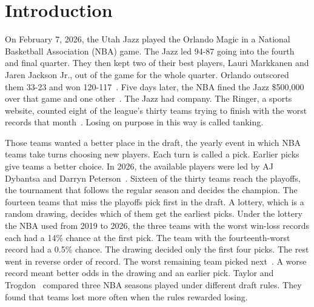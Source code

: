 \documentclass[11pt,letterpaper]{article}
\begin{document}
\section{Introduction}

On February 7, 2026, the Utah Jazz played the Orlando Magic in a National Basketball Association (NBA) game. The Jazz led 94-87 going into the fourth and final quarter. They then kept two of their best players, Lauri Markkanen and Jaren Jackson Jr., out of the game for the whole quarter. Orlando outscored them 33-23 and won 120-117~\cite{espn2026jazzmagic}. Five days later, the NBA fined the Jazz \$500,000 over that game and one other~\cite{nba2026fines}. The Jazz had company. The Ringer, a sports website, counted eight of the league's thirty teams trying to finish with the worst records that month~\cite{ringer2026tanking}. Losing on purpose in this way is called tanking.

Those teams wanted a better place in the draft, the yearly event in which NBA teams take turns choosing new players. Each turn is called a pick. Earlier picks give teams a better choice. In 2026, the available players were led by AJ Dybantsa and Darryn Peterson~\cite{ringer2026tanking}. Sixteen of the thirty teams reach the playoffs, the tournament that follows the regular season and decides the champion. The fourteen teams that miss the playoffs pick first in the draft. A lottery, which is a random drawing, decides which of them get the earliest picks. Under the lottery the NBA used from 2019 to 2026, the three teams with the worst win-loss records each had a 14\% chance at the first pick. The team with the fourteenth-worst record had a 0.5\% chance. The drawing decided only the first four picks. The rest went in reverse order of record. The worst remaining team picked next~\cite{nba2019lotteryreform}. A worse record meant better odds in the drawing and an earlier pick. Taylor and Trogdon~\cite{taylor2002losing} compared three NBA seasons played under different draft rules. They found that teams lost more often when the rules rewarded losing.
\end{document}
